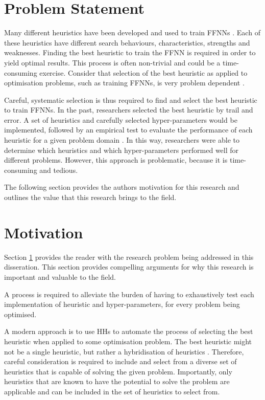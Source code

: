\section{Problem Statement}\label{sec:introduction:problem}

Many different heuristics have been developed and used to train \acp{FFNN} \cite{ref:gudise:2003, ref:rakitianskaia:2012, ref:montana:1989}. Each of these heuristics have different search behaviours, characteristics, strengths and weaknesses. Finding the best heuristic to train the \ac{FFNN} is required in order to yield optimal results. This process is often non-trivial and could be a time-consuming exercise.  Consider that selection of the best heuristic as applied to optimisation problems, such as training \acp{FFNN}, is very problem dependent \cite{ref:allen:1996, ref:drake:2020, ref:pillay:2018}.

Careful, systematic selection is thus required to find and select the best heuristic to train \acp{FFNN}. In the past, researchers selected the best heuristic by trail and error. A set of heuristics and carefully selected hyper-parameters would be implemented, followed by an empirical test to evaluate the performance of each heuristic for a given problem domain \cite{ref:pillay:2015}. In this way, researchers were able to determine which heuristics and which hyper-parameters performed well for different problems. However, this approach is problematic, because it is time-consuming and tedious.

The following section provides the authors motivation for this research and outlines the value that this research brings to the field.


\section{Motivation}\label{sec:introduction:motivation}

Section \ref{sec:introduction:problem} provides the reader with the research problem being addressed in this disseration. This section provides compelling arguments for why this research is important and valuable to the field.

A process is required to alleviate the burden of having to exhaustively test each implementation of heuristic and hyper-parameters, for every problem being optimised.

A modern approach is to use \acp{HH} to automate the process of selecting the best heuristic when applied to some optimisation problem. The best heuristic might not be a single heuristic, but rather a hybridisation of heuristics \cite{ref:pillay:2015}. Therefore, careful consideration is required to include and select from a diverse set of heuristics that is capable of solving the given problem. Importantly, only heuristics that are known to have the potential to solve the problem are applicable and can be included in the set of heuristics to select from.

